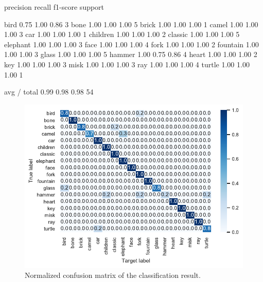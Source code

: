 \begin{sh}
             precision    recall  f1-score   support

       bird       0.75      1.00      0.86         3
       bone       1.00      1.00      1.00         5
      brick       1.00      1.00      1.00         1
      camel       1.00      1.00      1.00         3
        car       1.00      1.00      1.00         1
   children       1.00      1.00      1.00         2
    classic       1.00      1.00      1.00         5
   elephant       1.00      1.00      1.00         3
       face       1.00      1.00      1.00         4
       fork       1.00      1.00      1.00         2
   fountain       1.00      1.00      1.00         3
      glass       1.00      1.00      1.00         5
     hammer       1.00      0.75      0.86         4
      heart       1.00      1.00      1.00         2
        key       1.00      1.00      1.00         3
       misk       1.00      1.00      1.00         3
        ray       1.00      1.00      1.00         4
     turtle       1.00      1.00      1.00         1

avg / total       0.99      0.98      0.98        54
\end{sh}

\begin{figure}[H]
\centering
\includegraphics[width=.8\linewidth]{confusion_norm_mlp.pdf}
\caption{Normalized confusion matrix of the classification result.}
 \label{fig:machine_learning:python:confusion}
\end{figure}
